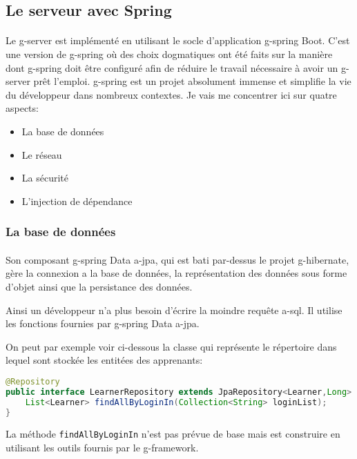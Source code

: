 \subsection{Le serveur avec Spring}
\label{subsec:server-spring}

\paragraph{}
Le \gls{g-server} est implémenté en utilisant le socle d'application \Gls{g-spring} Boot.
C'est une version de \gls{g-spring} où des choix dogmatiques ont été faits sur la manière dont \gls{g-spring} doit être configuré afin de réduire le travail nécessaire à avoir un \gls{g-server} prêt l'emploi.
\Gls{g-spring} est un projet absolument immense et simplifie la vie du développeur dans nombreux contextes.
Je vais me concentrer ici sur quatre aspects:
\begin{itemize}
    \item La base de données
    \item Le réseau
    \item La sécurité
    \item L'injection de dépendance
\end{itemize}

\subsubsection{La base de données}
\label{subsubsec:spring-data-jpa}

\paragraph{}
Son composant \gls{g-spring} Data \acrshort{a-jpa}, qui est bati par-dessus le projet \gls{g-hibernate}, gère la connexion a la base de données, la représentation des données sous forme d'objet ainsi que la persistance des données.

Ainsi un développeur n'a plus besoin d'écrire la moindre requête \gls{a-sql}.
Il utilise les fonctions fournies par \gls{g-spring} Data \acrshort{a-jpa}.

On peut par exemple voir ci-dessous la classe qui représente le répertoire dans lequel sont stockée les entitées des apprenants:
\begin{lstlisting}[language=Java]
@Repository
public interface LearnerRepository extends JpaRepository<Learner,Long> {
    List<Learner> findAllByLoginIn(Collection<String> loginList);
}
\end{lstlisting}
La méthode \lstinline{findAllByLoginIn} n'est pas prévue de base mais est construire en utilisant les outils fournis par le \gls{g-framework}.

